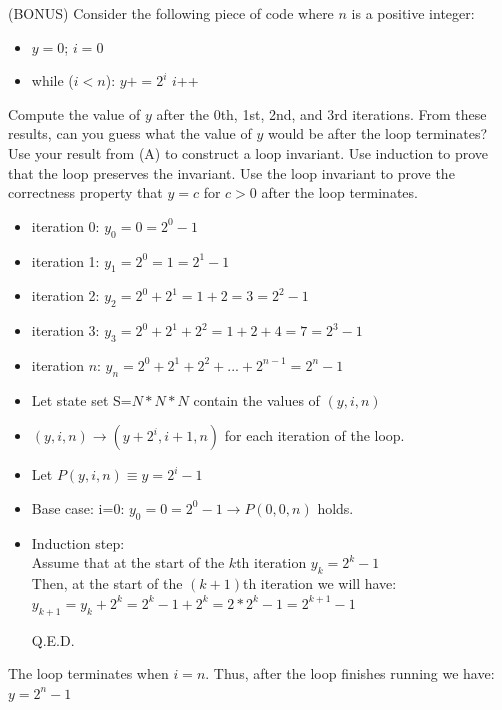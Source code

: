 \documentclass[solution, letterpaper]{cs20inclass}
\begin{document}
\problem (BONUS) Consider the following piece of code where $n$ is a positive integer:
\begin{itemize}
\item $y=0$; $i=0$
\item while ($i< n$):
\subitem $y += 2^i$
\subitem $i$++
\end{itemize}
\subproblem Compute the value of $y$ after the 0th, 1st, 2nd, and 3rd iterations. From these results, can you guess what the value of $y$ would be after the loop terminates?
\subproblem Use your result from (A) to construct a loop invariant.
\subproblem Use induction to prove that the loop preserves the invariant.
\subproblem Use the loop invariant to prove the correctness property that $y=c$ for $c>0$ after the loop terminates.

\begin{solution}
\subsolution
\begin{itemize}
\item iteration 0: $y_0=0=2^0-1$
\item iteration 1: $y_1=2^0=1=2^1-1$
\item iteration 2: $y_2=2^0+2^1=1+2=3=2^2-1$
\item iteration 3: $y_3=2^0+2^1+2^2=1+2+4=7=2^3-1$
\item iteration $n$: $y_n=2^0+2^1+2^2+...+2^{n-1}=2^n-1$
\end{itemize}
\subsolution
\begin{itemize}
\item Let state set S=$N*N*N$ contain the values of $(y, i, n)$
\item $(y,i,n) \rightarrow (y+2^i, i+1, n)$ for each iteration of the loop.
\item Let $P(y, i, n)\equiv y=2^i -1$ 
\end{itemize}
\subsolution
\begin{itemize}
\item Base case: i=0: $y_0=0=2^0-1 \rightarrow P(0,0,n)$ holds.
\item Induction step: \\
Assume that at the start of the $k$th iteration $y_k=2^k-1$\\
Then, at the start of the $(k+1)$th iteration we will have:\\
$y_{k+1}=y_k+2^k=2^k-1+2^k=2*2^k-1=2^{k+1}-1$ 

Q.E.D.
\end{itemize}
\subsolution
The loop terminates when $i=n$. Thus, after the loop finishes running we have: $y=2^{n}-1$
\end{solution}
\end{document}

